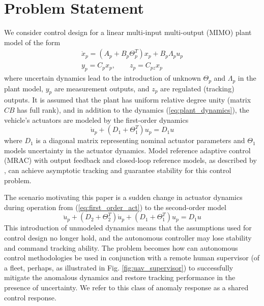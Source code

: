\documentclass[english]{ifacconf}
\begin{document}
\section{Problem Statement}\label{sec:problem}
We consider control design for a linear multi-input multi-output (MIMO) plant model of the form
\begin{equation}
\begin{gathered}
\dot x_p = (A_p + B_p \Theta_p^T) x_p + B_p \Lambda_p u_p \\
y_p = C_p x_p, \qquad z_p = C_{pz} x_p \label{eq:plant_dynamics}
\end{gathered}
\end{equation}
where uncertain dynamics lead to the introduction of unknown $\Theta_p$ and $\Lambda_p$ in the plant model, $y_p$ are measurement outputs, and $z_p$ are regulated (tracking) outputs. It is assumed that the plant has uniform relative degree unity (matrix $CB$ has full rank), and in addition to the dynamics (\ref{eq:plant_dynamics}), the vehicle's actuators are modeled by the first-order dynamics
\begin{equation}
	\dot{u}_p + (D_1 + \Theta_1^T) u_p = D_1 u \label{eq:first_order_act}
\end{equation}
where $D_1$ is a diagonal matrix representing nominal actuator parameters and $\Theta_1$ models uncertainty in the actuator dynamics. Model reference adaptive control (MRAC) with output feedback and closed-loop reference models, as described by \cite{qu2016adaptive}, can achieve asymptotic tracking and guarantee stability for this control problem. 

The scenario motivating this paper is a sudden change in actuator dynamics during operation from (\ref{eq:first_order_act}) to the second-order model
\begin{equation}
	\ddot{u}_p + (D_2 + \Theta_2^T) \dot{u}_p + (D_1 + \Theta_1^T) u_p = D_1 u \label{eq:second_order_act}
\end{equation}
This introduction of unmodeled dynamics means that the assumptions used for control design no longer hold, and the autonomous controller may lose stability and command tracking ability. The problem becomes how can autonomous control methodologies be used in conjunction with a remote human supervisor (of a fleet, perhaps, as illustrated in Fig. \ref{fig:uav_supervisor}) to successfully mitigate the anomalous dynamics and restore tracking performance in the presence of uncertainty. We refer to this class of anomaly response as a shared control response.
\end{document}
